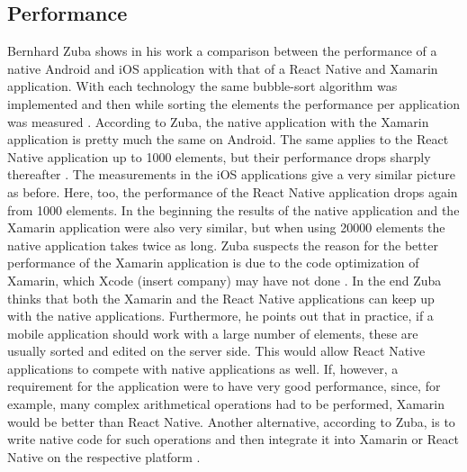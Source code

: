 \documentclass[Bachelor,BIF,english]{twbook}
\begin{document}
\subsection{Performance}
Bernhard Zuba shows in his work \cite{ZubaBernhard2017EdPb} a comparison between the performance of a native Android and iOS application with that of a React Native and Xamarin application. With each technology the same bubble-sort algorithm was implemented and then while sorting the elements the performance per application was measured \cite[p.~30]{ZubaBernhard2017EdPb}. According to Zuba, the native application with the Xamarin application is pretty much the same on Android. The same applies to the React Native application up to 1000 elements, but their performance drops sharply thereafter \cite[p.~30]{ZubaBernhard2017EdPb}. The measurements in the iOS applications give a very similar picture as before. Here, too, the performance of the React Native application drops again from 1000 elements. In the beginning the results of the native application and the Xamarin application were also very similar, but when using 20000 elements the native application takes twice as long. Zuba suspects the reason for the better performance of the Xamarin application is due to the code optimization of Xamarin, which Xcode (insert company) may have not done \cite[p.~31]{ZubaBernhard2017EdPb}. In the end Zuba thinks that both the Xamarin and the React Native applications can keep up with the native applications. Furthermore, he points out that in practice, if a mobile application should work with a large number of elements, these are usually sorted and edited on the server side. This would allow React Native applications to compete with native applications as well. If, however, a requirement for the application were to have very good performance, since, for example, many complex arithmetical operations had to be performed, Xamarin would be better than React Native. Another alternative, according to Zuba, is to write native code for such operations and then integrate it into Xamarin or React Native on the respective platform \cite[p.~32]{ZubaBernhard2017EdPb}.
\end{document}
